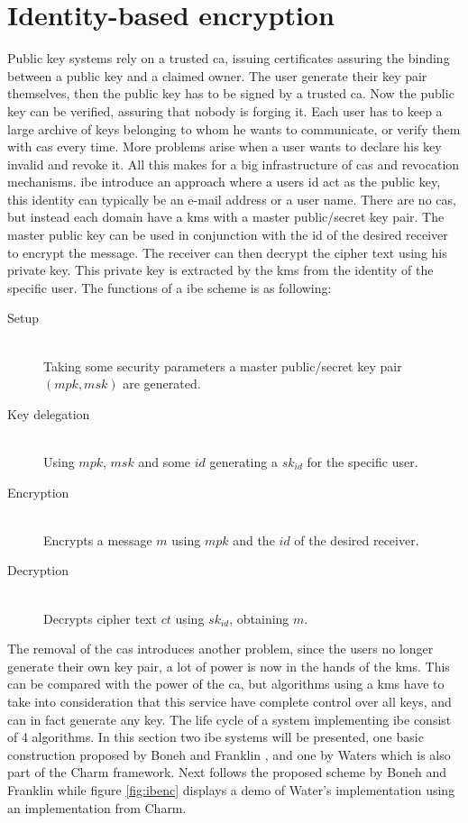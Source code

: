 \section{Identity-based encryption}\label{subsec:IBE}
Public key systems rely on a trusted \gls{ca}, issuing certificates assuring the binding between a public key and a claimed owner. The user generate their key pair themselves, then the public key has to be signed by a trusted \glsdesc{ca}. Now the public key can be verified, assuring that nobody is forging it. Each user has to keep a large archive of keys belonging to whom he wants to communicate, or verify them with \glspl{ca} every time. More problems arise when a user wants to declare his key invalid and revoke it. All this makes for a big infrastructure of \glspl{ca} and revocation mechanisms. \Gls{ibe} \cite{DBLP:ibe} introduce an approach where a users id act as the public key, this identity can typically be an e-mail address or a user name. There are no \glspl{ca}, but instead each domain have a \gls{kms} with a master public/secret key pair. The master public key can be used in conjunction with the id of the desired receiver to encrypt the message. The receiver can then decrypt the cipher text using his private key. This private key is extracted by the \gls{kms} from the identity of the specific user. 
The functions of a \gls{ibe} scheme is as following:
\begin{description}
\item[Setup]\hfill \\ Taking some security parameters a master public/secret key pair $(mpk, msk)$ are generated.
\item[Key delegation]\hfill \\Using $mpk$, $msk$ and some $id$ generating a $sk_{id}$ for the specific user. 
\item[Encryption]\hfill \\ Encrypts a message $m$ using $mpk$ and the $id$ of the desired receiver. 
\item[Decryption] \hfill \\Decrypts cipher text $ct$ using $sk_{id}$, obtaining $m$. 
\end{description}
The removal of the \glspl{ca} introduces another problem, since the users no longer generate their own key pair, a lot of power is now in the hands of the \gls{kms}. This can be compared with the power of the \gls{ca}, but algorithms using a \gls{kms} have to take into consideration that this service have complete control over all keys, and can in fact generate any key. The life cycle of a system implementing \gls{ibe} consist of 4 algorithms. In this section two \gls{ibe} systems will be presented, one basic construction proposed by Boneh and Franklin \cite{DBLP:ibe}, and one by Waters \cite{ibe_waters09} which is also part of the Charm framework. Next follows the proposed scheme by Boneh and Franklin while figure \ref{fig:ibenc} displays a demo of Water's implementation using an implementation from Charm.


